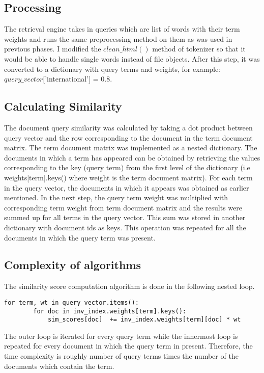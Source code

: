 \documentclass[paper=a4, fontsize=11pt]{scrartcl}
\numberwithin{equation}{section}		%
\numberwithin{figure}{section}			%
\numberwithin{table}{section}				%
\begin{document}
\subsection{Processing}

The retrieval engine takes in queries which are list of words with their term weights and runs the same preprocessing method on them as was used in previous phases. I modified the $clean\_html()$ method of tokenizer so that it would be able to handle single words instead of file objects. After this step, it was converted to a dictionary with query terms and weights, for example: $query\_vector$['international'] = 0.8.  

\subsection{Calculating Similarity}

The document query similarity was calculated by taking a dot product between query vector and the row corresponding to the document in the term document matrix. The term document matrix was implemented as a nested dictionary. The documents in which a term has appeared can be obtained by retrieving the values corresponding to the key (query term) from the first level of the dictionary (i.e weights[term].keys() where weight is the term document matrix). For each term in the query vector, the documents in which it appears was obtained as earlier mentioned. In the next step, the query term weight was multiplied with corresponding term weight from term document matrix and the results were summed up for all terms in the query vector. This sum was stored in another dictionary with document ids as keys. This operation was repeated for all the documents in which the query term was present.

\subsection{Complexity of algorithms}

The similarity score computation algorithm is done in the following nested loop.

\begin{verbatim}
for term, wt in query_vector.items():
        for doc in inv_index.weights[term].keys():
            sim_scores[doc]  += inv_index.weights[term][doc] * wt
\end{verbatim}

The outer loop is iterated for every query term while the innermost loop is repeated for every document in which the query term in present. Therefore, the time complexity is roughly number of query terms times the number of the documents which contain the term. 
\end{document}
